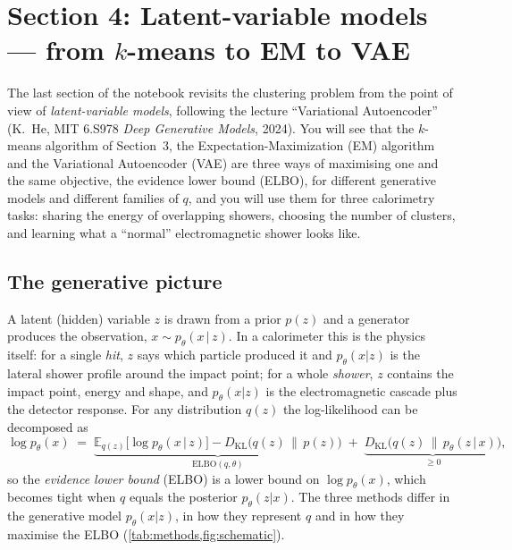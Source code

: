\documentclass[a4paper,12pt]{article}
\begin{document}
\newpage
\sloppy %
\section*{Section 4: Latent-variable models --- from $k$-means to EM to VAE}

The last section of the notebook revisits the clustering problem from the point of view of \emph{latent-variable models}, following the lecture
``Variational Autoencoder'' (K.~He, MIT 6.S978 \emph{Deep Generative Models}, 2024).
You will see that the $k$-means algorithm of Section~3, the Expectation-Maximization (EM) algorithm and the Variational Autoencoder (VAE) are three ways of
maximising one and the same objective, the evidence lower bound (ELBO), for different generative models and different families of $q$, and you will use them for three calorimetry tasks:
sharing the energy of overlapping showers, choosing the number of clusters, and learning what a ``normal'' electromagnetic shower looks like.

\subsection*{The generative picture}

A latent (hidden) variable $z$ is drawn from a prior $p(z)$ and a generator produces the observation, $x\sim p_\theta(x\,|\,z)$.
In a calorimeter this is the physics itself: for a single \emph{hit}, $z$ says which particle produced it and $p_\theta(x|z)$ is the lateral shower profile around the impact point;
for a whole \emph{shower}, $z$ contains the impact point, energy and shape, and $p_\theta(x|z)$ is the electromagnetic cascade plus the detector response.
For any distribution $q(z)$ the log-likelihood can be decomposed as
\begin{equation}
\log p_\theta(x) \;=\; \underbrace{\mathbb{E}_{q(z)}\big[\log p_\theta(x\,|\,z)\big] - D_\mathrm{KL}\big(q(z)\,\|\,p(z)\big)}_{\text{ELBO}(q,\theta)}
\;+\; \underbrace{D_\mathrm{KL}\big(q(z)\,\|\,p_\theta(z\,|\,x)\big)}_{\geq 0},
\label{eq:elbo}
\end{equation}
so the \emph{evidence lower bound} (ELBO) is a lower bound on $\log p_\theta(x)$, which becomes tight when $q$ equals the posterior $p_\theta(z|x)$.
The three methods differ in the generative model $p_\theta(x|z)$, in how they represent $q$ and in how they maximise the ELBO (\cref{tab:methods,fig:schematic}).
\end{document}
